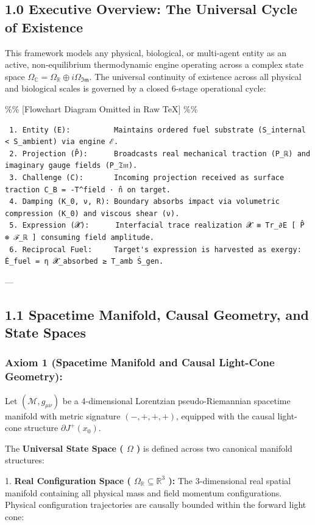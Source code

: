 \documentclass[11pt,a4paper]{article}
\theoremstyle{definition}
\theoremstyle{remark}
\begin{document}
\subsection{1.0 Executive Overview: The Universal Cycle of Existence}
This framework models any physical, biological, or multi-agent entity as an active, non-equilibrium thermodynamic engine operating across a complex state space $\Omega_{\mathbb{C}} = \Omega_{\mathbb{R}} \oplus i \Omega_{\mathfrak{Im}}$. The universal continuity of existence across all physical and biological scales is governed by a closed 6-stage operational cycle:

\%\% [Flowchart Diagram Omitted in Raw TeX] \%\%

\begin{verbatim}
 1. Entity (E):          Maintains ordered fuel substrate (S_internal < S_ambient) via engine ℰ.
 2. Projection (P̂):      Broadcasts real mechanical traction (P_ℝ) and imaginary gauge fields (P_𝔗𝔪).
 3. Challenge (C):       Incoming projection received as surface traction C_B = -T^field · n̂ on target.
 4. Damping (K_0, ν, R): Boundary absorbs impact via volumetric compression (K_0) and viscous shear (ν).
 5. Expression (𝓧):      Interfacial trace realization 𝓧 ≡ Tr_∂E [ P̂ ⊗ ℱ_ℝ ] consuming field amplitude.
 6. Reciprocal Fuel:     Target's expression is harvested as exergy: Ė_fuel = η 𝓧_absorbed ≥ T_amb Ṡ_gen.
\end{verbatim}

---

\subsection{1.1 Spacetime Manifold, Causal Geometry, and State Spaces}

\subsubsection{Axiom 1 (Spacetime Manifold and Causal Light-Cone Geometry):}
Let $(\mathcal{M}, g_{\mu\nu})$ be a 4-dimensional Lorentzian pseudo-Riemannian spacetime manifold with metric signature $(-, +, +, +)$, equipped with the causal light-cone structure $\partial J^+(x_0)$.

The \textbf{Universal State Space ( $\Omega$ )} is defined across two canonical manifold structures:

1. \textbf{Real Configuration Space ( $\Omega_{\mathbb{R}} \subseteq \mathbb{R}^3$ ):}
The 3-dimensional real spatial manifold containing all physical mass and field momentum configurations. Physical configuration trajectories are causally bounded within the forward light cone:
\end{document}
